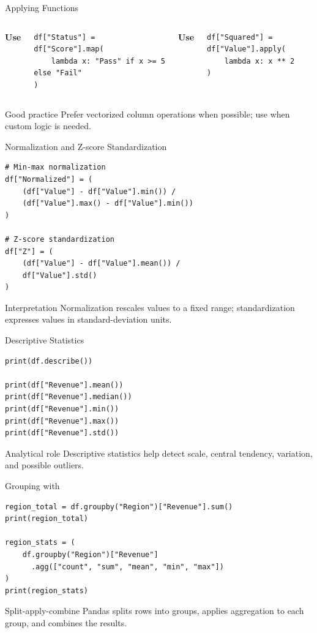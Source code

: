 \documentclass[aspectratio=169,11pt]{beamer}
\newcommand{\cmd}[1]{\texttt{\detokenize{#1}}}
\begin{document}
\begin{frame}[fragile]{Applying Functions}
\small
\begin{columns}[T]
\textbf{Use \cmd{map()}}
\begin{lstlisting}[style=py]
df["Status"] = df["Score"].map(
    lambda x: "Pass" if x >= 5 else "Fail"
)
\end{lstlisting}
\textbf{Use \cmd{apply()}}
\begin{lstlisting}[style=py]
df["Squared"] = df["Value"].apply(
    lambda x: x ** 2
)
\end{lstlisting}
\end{columns}
\begin{alertblock}{Good practice}
Prefer vectorized column operations when possible; use \cmd{apply()} when custom logic is needed.
\end{alertblock}
\end{frame}

\begin{frame}[fragile]{Normalization and Z-score Standardization}
\small
\begin{lstlisting}[style=py]
# Min-max normalization
df["Normalized"] = (
    (df["Value"] - df["Value"].min()) /
    (df["Value"].max() - df["Value"].min())
)

# Z-score standardization
df["Z"] = (
    (df["Value"] - df["Value"].mean()) /
    df["Value"].std()
)
\end{lstlisting}
\begin{block}{Interpretation}
Normalization rescales values to a fixed range; standardization expresses values in standard-deviation units.
\end{block}
\end{frame}

\begin{frame}[fragile]{Descriptive Statistics}
\small
\begin{lstlisting}[style=py]
print(df.describe())

print(df["Revenue"].mean())
print(df["Revenue"].median())
print(df["Revenue"].min())
print(df["Revenue"].max())
print(df["Revenue"].std())
\end{lstlisting}
\begin{block}{Analytical role}
Descriptive statistics help detect scale, central tendency, variation, and possible outliers.
\end{block}
\end{frame}

\begin{frame}[fragile]{Grouping with \cmd{groupby()}}
\small
\begin{lstlisting}[style=py]
region_total = df.groupby("Region")["Revenue"].sum()
print(region_total)

region_stats = (
    df.groupby("Region")["Revenue"]
      .agg(["count", "sum", "mean", "min", "max"])
)
print(region_stats)
\end{lstlisting}
\begin{block}{Split-apply-combine}
Pandas splits rows into groups, applies aggregation to each group, and combines the results.
\end{block}
\end{frame}
\end{document}
